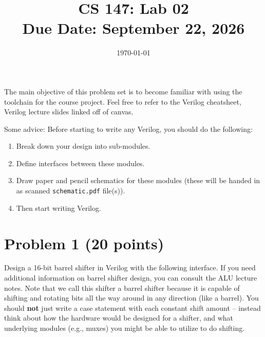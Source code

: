 \documentclass[12pt]{article}
\title{CS 147: Lab 02 \\ Due Date: September 22, 2026}
\author{}
\date{\today}
\begin{document}
\maketitle
The main objective of this problem set is to become familiar with using the toolchain for the course project.  
Feel free to refer
to the Verilog cheatsheet, Verilog lecture slides linked off of canvas. 

Some advice: Before starting to write any Verilog, you should do the following:
\begin{enumerate}
\item
Break down your design into sub-modules.
\item Define interfaces between these modules.
\item Draw paper and pencil schematics for these modules (these will be handed in as scanned
\texttt{schematic.pdf} file(s)).
\item Then start writing Verilog.
\end{enumerate}

\section*{Problem 1 (20 points)}
Design a 16-bit barrel shifter in Verilog with the following interface. If you need additional information on
barrel shifter design, you can consult the ALU lecture notes. Note that we call this shifter a barrel shifter
because it is capable of shifting and rotating bits all the way around in any direction (like a barrel). You
should \textbf{not} just write a case statement with each constant shift amount – instead think about how the
hardware would be designed for a shifter, and what underlying modules (e.g., muxes) you might be able to
utilize to do shifting. 
\end{document}
